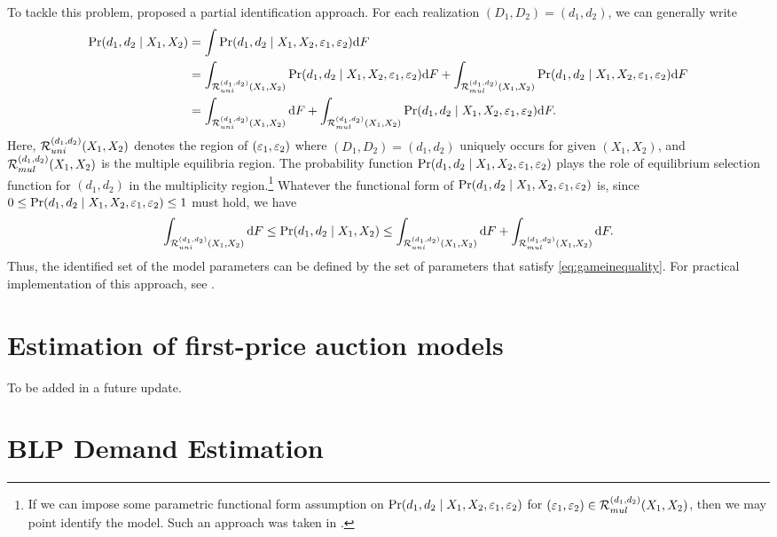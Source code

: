 \documentclass[11pt, A4paper, openany, uplatex]{book}
\begin{document}
To tackle this problem, \cite{ciliberto2009market} proposed a partial identification approach.
For each realization $(D_1, D_2) = (d_1, d_2)$, we can generally write
\begin{align*}
	\Pr(d_1, d_2 \mid X_1, X_2) 
	& = \int \Pr(d_1, d_2 \mid X_1, X_2, \varepsilon_1, \varepsilon_2) \text{d}F \\
	& = \int_{\mathcal{R}_{uni}^{(d_1, d_2)}(X_1, X_2)} \Pr(d_1, d_2 \mid X_1, X_2, \varepsilon_1, \varepsilon_2) \text{d}F + \int_{\mathcal{R}_{mul}^{(d_1, d_2)}(X_1, X_2)} \Pr(d_1, d_2 \mid X_1, X_2, \varepsilon_1, \varepsilon_2) \text{d}F \\
	& = \int_{\mathcal{R}_{uni}^{(d_1,d_2)}(X_1,X_2)} \text{d}F + \int_{\mathcal{R}_{mul}^{(d_1, d_2)}(X_1,X_2)} \Pr(d_1, d_2 \mid X_1, X_2, \varepsilon_1, \varepsilon_2) \text{d}F.
\end{align*}
Here, $\mathcal{R}_{uni}^{(d_1,d_2)}(X_1, X_2)$ denotes the region of $(\varepsilon_1, \varepsilon_2)$ where $(D_1, D_2) = (d_1, d_2)$ uniquely occurs for given $(X_1, X_2)$, and $\mathcal{R}_{mul}^{(d_1,d_2)}(X_1, X_2)$ is the multiple equilibria region.
The probability function $\Pr(d_1, d_2 \mid X_1, X_2, \varepsilon_1, \varepsilon_2)$ plays the role of equilibrium selection function for $(d_1, d_2)$ in the multiplicity region.\footnote{
	If we can impose some parametric functional form assumption on $\Pr(d_1, d_2 \mid X_1, X_2, \varepsilon_1, \varepsilon_2)$ for $(\varepsilon_1, \varepsilon_2) \in \mathcal{R}_{mul}^{(d_1, d_2)}(X_1,X_2)$, then we may point identify the model.
	Such an approach was taken in \cite{bajari2010identification}.
}
Whatever the functional form of $\Pr(d_1, d_2 \mid X_1, X_2, \varepsilon_1, \varepsilon_2)$ is, since $0 \le \Pr(d_1, d_2 \mid X_1, X_2, \varepsilon_1, \varepsilon_2) \le 1$ must hold, we have
\begin{align}\label{eq:gameinequality}
	\int_{\mathcal{R}_{uni}^{(d_1,d_2)}(X_1,X_2)} \text{d}F
	\le \Pr(d_1, d_2 \mid X_1, X_2) 
	\le \int_{\mathcal{R}_{uni}^{(d_1,d_2)}(X_1,X_2)} \text{d}F + \int_{\mathcal{R}_{mul}^{(d_1, d_2)}(X_1,X_2)} \text{d}F. 
\end{align}
Thus, the identified set of the model parameters can be defined by the set of parameters that satisfy \eqref{eq:gameinequality}.
For practical implementation of this approach, see \cite{ciliberto2009market}.

\section{Estimation of first-price auction models}

To be added in a future update.

\section{BLP Demand Estimation}
\end{document}
